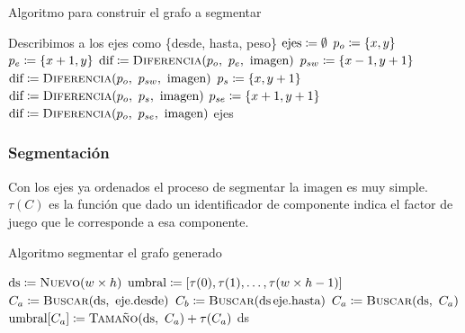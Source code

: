 \begin{algorithm}[H]
\caption{Algoritmo para construir el grafo a segmentar}
\begin{algorithmic}[1]
\Statex{}
	\Statex{} \Comment{} Describimos a los ejes como \{desde, hasta, peso\}
	\State{} $\text{ejes} \coloneqq \emptyset$
			\State{} $p_o \coloneqq \{x, y\}$
			\State{} $p_e \coloneqq \{x + 1, y\}$
				\State{} $\text{dif}
					\is \Call{Diferencia}{p_o,\ p_e,\ \text{imagen}}$
				\State{} 
			\EndIf{}
			\State{} $p_{sw} \coloneqq \{x - 1, y + 1\}$
				\State{} $\text{dif}
					\is \Call{Diferencia}{p_o,\ p_{sw},\ \text{imagen}}$
				\State{} 
			\EndIf{}
			\State{} $p_s \coloneqq \{x, y + 1\}$
				\State{} $\text{dif}
					\is \Call{Diferencia}{p_o,\ p_s,\ \text{imagen}}$
				\State{} 
			\EndIf{}
			\State{} $p_{se} \coloneqq \{x + 1, y + 1\}$
				\State{} $\text{dif}
					\is \Call{Diferencia}{p_o,\ p_{se},\ \text{imagen}}$
				\State{} 
			\EndIf{}
		\EndFor{}
	\EndFor{}
	\State{} \Return{} ejes
\EndFunction{}
\end{algorithmic}
\end{algorithm}

\subsubsection{Segmentación}

Con los ejes ya ordenados el proceso de segmentar la imagen es muy simple.
$\tau(C)$ es la función que dado un identificador de componente indica el
factor de juego que le corresponde a esa componente.

\begin{algorithm}[H]
\caption{Algoritmo segmentar el grafo generado}
\begin{algorithmic}[1]
\Statex{}
	\State{} $\text{ds} \is \Call{Nuevo}{w \times h}$
	\State{} $\text{umbral} \coloneqq [\tau(0), \tau(1), \dots, \tau(w \times h - 1)]$
		\State{} $C_a \is \Call{Buscar}{\text{ds},\ \text{eje}.\text{desde}}$
		\State{} $C_b \is \Call{Buscar}{\text{ds}\, \text{eje}.\text{hasta}}$
			\State{} 
			\State{} $C_a \is \Call{Buscar}{\text{ds},\ C_a}$
			\State{} $\text{umbral}[C_a] \is \Call{Tamaño}{\text{ds},\ C_a}
				+ \tau(C_a)$
		\EndIf{}
	\EndFor{}
	\State{} \Return{} ds
\EndFunction{}
\end{algorithmic}
\end{algorithm}

